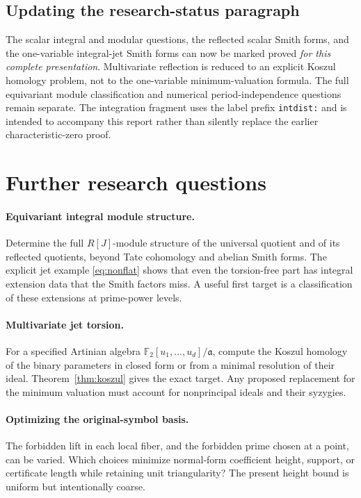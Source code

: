 \documentclass[11pt]{article}
\numberwithin{equation}{section}
\theoremstyle{definition}
\theoremstyle{remark}
\newcommand{\F}{\mathbb{F}_2}
\newcommand{\code}[1]{\texttt{\small #1}}
\begin{document}
\subsection{Updating the research-status paragraph}
The scalar integral and modular questions, the reflected scalar Smith
forms, and the one-variable integral-jet Smith forms can now be marked
proved \emph{for this complete presentation}. Multivariate reflection
is reduced to an explicit Koszul homology problem, not to the
one-variable minimum-valuation formula. The full equivariant module
classification and numerical period-independence questions remain
separate. The integration fragment uses the label prefix
\code{intdist:} and is intended to accompany this report rather than
silently replace the earlier characteristic-zero proof.

\section{Further research questions}
\label{sec:future}
\paragraph{Equivariant integral module structure.}
Determine the full $R[J]$-module structure of the universal quotient and
of its reflected quotients, beyond Tate cohomology and abelian Smith
forms. The explicit jet example \eqref{eq:nonflat} shows that even the
torsion-free part has integral extension data that the Smith factors
miss. A useful first target is a classification of these extensions
at prime-power levels.

\paragraph{Multivariate jet torsion.}
For a specified Artinian algebra
$\F[u_1,\ldots,u_d]/\mathfrak a$, compute the Koszul homology of the
binary parameters in closed form or from a minimal resolution of their
ideal. Theorem~\ref{thm:koszul} gives the exact target. Any proposed
replacement for the minimum valuation must account for nonprincipal
ideals and their syzygies.

\paragraph{Optimizing the original-symbol basis.}
The forbidden lift in each local fiber, and the forbidden prime chosen
at a point, can be varied. Which choices minimize normal-form coefficient
height, support, or certificate length while retaining unit triangularity?
The present height bound is uniform but intentionally coarse.
\end{document}
